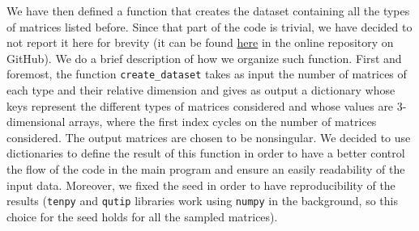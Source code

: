 \documentclass[a4paper,11pt]{report}
\begin{document}
\noindent We have then defined a function that creates the dataset containing all the types of matrices listed before. Since that part of the code is trivial, we have decided to not report it here for brevity (it can be found \href{https://github.com/nunziacerrato/Numerical_Analysis_Optimization/blob/main/Project_1/Project_1.py}{here} in the online repository on GitHub). We do a brief description of how we organize such function. First and foremost, the function \texttt{create_dataset} takes as input the number of matrices of each type and their relative dimension and gives as output a dictionary whose keys represent the different types of matrices considered and whose values are 3-dimensional arrays, where the first index cycles on the number of matrices considered. The output matrices are chosen to be nonsingular. We decided to use dictionaries to define the result of this function in order to have a better control the flow of the code in the main program and ensure an easily readability of the input data. Moreover, we fixed the seed in order to have reproducibility of the results (\texttt{tenpy} and \texttt{qutip} libraries work using \texttt{numpy} in the background, so this choice for the seed holds for all the sampled matrices).
%
%
\end{document}
